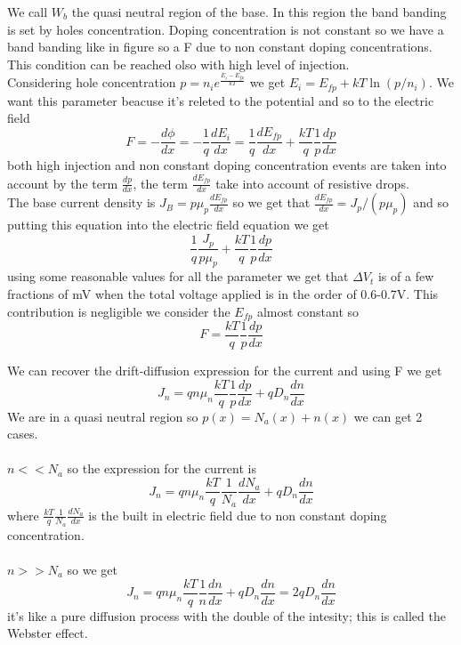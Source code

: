 We call $W_b$ the quasi neutral region of the base. In this region the band banding is set by holes concentration. Doping concentration is not constant so we have a band banding like in figure so a F due to non constant doping concentrations. This condition can be reached olso with high level of injection.\\
Considering hole concentration $p=n_ie^{\frac{E_i-E_{fp}}{kT}}$ we get $E_i=E_{fp}+kT\ln(p/n_i)$. We want this parameter beacuse it's releted to the potential and so to the electric field
\begin{equation}
F=-\frac{d\phi}{dx}=-\frac{1}{q}\frac{dE_{i}}{dx}=\frac{1}{q}\frac{dE_{fp}}{dx}+\frac{kT}{q}\frac{1}{p}\frac{dp}{dx}
\end{equation}
both high injection and non constant doping concentration events are taken into account by the term $\frac{dp}{dx}$, the term $\frac{dE_{fp}}{dx}$ take into account of resistive drops.\\
\vspace{5mm}
The base current density is $J_B=p\mu_p \frac{dE_{fp}}{dx}$ so we get that $\frac{dE_{fp}}{dx}=J_p/(p\mu_p)$ and so putting this equation into the electric field equation we get 
\begin{equation}
\frac{1}{q}\frac{J_p}{p\mu_p}+\frac{kT}{q}\frac{1}{p}\frac{dp}{dx}
\end{equation}
using some reasonable values for all the parameter we get that $\Delta V_t$ is of a few fractions of mV when the total voltage applied is in the order of 0.6-0.7V. This contribution is negligible we consider the $E_{fp}$ almost constant so 
\begin{equation}
F=\frac{kT}{q}\frac{1}{p}\frac{dp}{dx}
\end{equation}

\vspace{5mm}
We can recover the drift-diffusion expression for the current and using F we get
\begin{equation}
J_n=qn\mu_n \frac{kT}{q}\frac{1}{p}\frac{dp}{dx}+qD_n \frac{dn}{dx}
\end{equation}
We are in a quasi neutral region so $p(x)=N_a(x)+n(x)$ we can get 2 cases.\\
\vspace{3mm}
\\
$n<<N_a$ so the expression for the current is 
\begin{equation}
J_n=qn\mu_n \frac{kT}{q}\frac{1}{N_a}\frac{dN_a}{dx}+qD_n \frac{dn}{dx}
\end{equation}
where $\frac{kT}{q}\frac{1}{N_a}\frac{dN_a}{dx}$ is the built in electric field due to non constant doping concentration.\\
\vspace{3mm}
\\
$n>>N_a$ so we get 
\begin{equation}
J_n=qn\mu_n \frac{kT}{q}\frac{1}{n}\frac{dn}{dx}+qD_n \frac{dn}{dx}=2qD_n\frac{dn}{dx}
\end{equation}
it's like a pure diffusion process with the double of the intesity; this is called the Webster effect.\\

